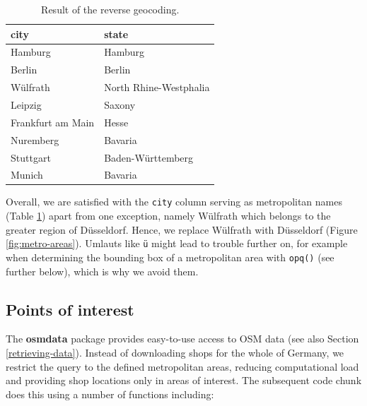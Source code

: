 \documentclass[]{krantz}
\newenvironment{Shaded}{\begin{snugshade}}{\end{snugshade}}
\newcommand{\KeywordTok}[1]{\textcolor[rgb]{0.27,0.27,0.27}{\textbf{#1}}}
\newcommand{\NormalTok}[1]{#1}
\newcommand{\OperatorTok}[1]{\textcolor[rgb]{0.43,0.43,0.43}{\textbf{#1}}}
\newcommand{\StringTok}[1]{\textcolor[rgb]{0.5,0.5,0.5}{#1}}
\begin{document}
\begin{table}[t]

\caption[Result of the reverse geocoding.]{\label{tab:metro-names}Result of the reverse geocoding.}
\centering
\begin{tabular}{ll}
\toprule
city & state\\
\midrule
Hamburg & Hamburg\\
Berlin & Berlin\\
Wülfrath & North Rhine-Westphalia\\
Leipzig & Saxony\\
Frankfurt am Main & Hesse\\
\addlinespace
Nuremberg & Bavaria\\
Stuttgart & Baden-Württemberg\\
Munich & Bavaria\\
\bottomrule
\end{tabular}
\end{table}

Overall, we are satisfied with the \texttt{city} column serving as metropolitan names (Table \ref{tab:metro-names}) apart from one exception, namely Wülfrath which belongs to the greater region of Düsseldorf.
Hence, we replace Wülfrath with Düsseldorf (Figure \ref{fig:metro-areas}).
Umlauts like \texttt{ü} might lead to trouble further on, for example when determining the bounding box of a metropolitan area with \texttt{opq()} (see further below), which is why we avoid them.

\begin{Shaded}
\end{Shaded}

\hypertarget{points-of-interest}{%
\subsection{Points of interest}\label{points-of-interest}}

The \textbf{osmdata} package provides easy-to-use access to OSM data (see also Section \ref{retrieving-data}).
Instead of downloading shops for the whole of Germany, we restrict the query to the defined metropolitan areas, reducing computational load and providing shop locations only in areas of interest.
The subsequent code chunk does this using a number of functions including:
\end{document}

